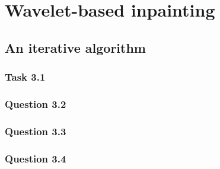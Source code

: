 \documentclass[a4paper]{article}
\begin{document}
    \section{Wavelet-based inpainting}

    \subsection{An iterative algorithm}

    \subsubsection{Task 3.1}

    \subsubsection{Question 3.2}

    \subsubsection{Question 3.3}

    \subsubsection{Question 3.4}

 
\end{document}

